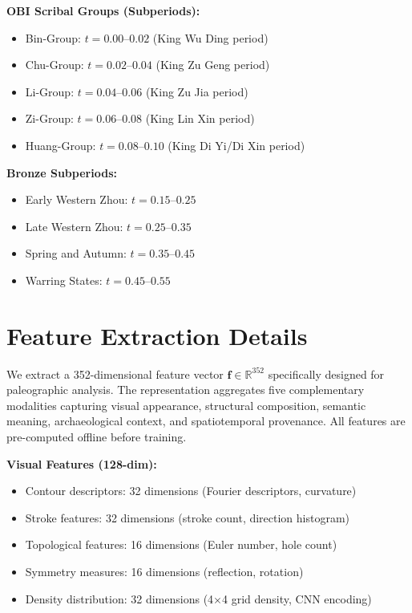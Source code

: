 \documentclass{article}
\begin{document}
\textbf{OBI Scribal Groups (Subperiods):}
\begin{itemize}[leftmargin=*,itemsep=1pt]
\item Bin-Group: $t = 0.00$--$0.02$ (King Wu Ding period)
\item Chu-Group: $t = 0.02$--$0.04$ (King Zu Geng period)
\item Li-Group: $t = 0.04$--$0.06$ (King Zu Jia period)
\item Zi-Group: $t = 0.06$--$0.08$ (King Lin Xin period)
\item Huang-Group: $t = 0.08$--$0.10$ (King Di Yi/Di Xin period)
\end{itemize}

\textbf{Bronze Subperiods:}
\begin{itemize}[leftmargin=*,itemsep=1pt]
\item Early Western Zhou: $t = 0.15$--$0.25$
\item Late Western Zhou: $t = 0.25$--$0.35$
\item Spring and Autumn: $t = 0.35$--$0.45$
\item Warring States: $t = 0.45$--$0.55$
\end{itemize}

\section{Feature Extraction Details}
\label{app:features}

We extract a 352-dimensional feature vector $\mathbf{f} \in \mathbb{R}^{352}$ specifically designed for paleographic analysis. The representation aggregates five complementary modalities capturing visual appearance, structural composition, semantic meaning, archaeological context, and spatiotemporal provenance. All features are pre-computed offline before training.

\textbf{Visual Features (128-dim):}
\begin{itemize}[leftmargin=*,itemsep=1pt]
\item Contour descriptors: 32 dimensions (Fourier descriptors, curvature)
\item Stroke features: 32 dimensions (stroke count, direction histogram)
\item Topological features: 16 dimensions (Euler number, hole count)
\item Symmetry measures: 16 dimensions (reflection, rotation)
\item Density distribution: 32 dimensions (4$\times$4 grid density, CNN encoding)
\end{itemize}
\end{document}
